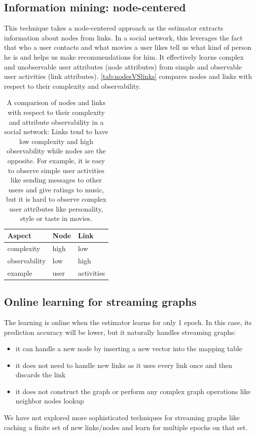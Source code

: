 \documentclass{article}
\begin{document}
\subsection{Information mining: node-centered}
This technique takes a node-centered approach as the estimator extracts 
information about nodes from links.
In a social network, this leverages the fact that who a user contacts and what 
movies a user likes tell us what kind of person he is and helps us make 
recommendations for him.
It effectively learns complex and unobservable user attributes (node 
attributes) from simple and observable user activities (link attributes). 
\autoref{tab:nodesVSlinks} compares nodes and links with respect to their 
complexity and observability.
\begin{table}[h]
	\centering
	\caption{A comparison of nodes and links with respect to their complexity 
		and attribute observability in a social network:
		Links tend to have low complexity and high observability while nodes 
		are the opposite.
		For example, it is easy to observe simple user activities like sending 
		messages to other users and give ratings to music,
		but it is hard to observe complex user attributes like personality, 
		style or taste in movies.}
	\begin{tabularx}{0.5\textwidth}{ |X|X|X| } \hline
		\textbf{Aspect} & \textbf{Node} & \textbf{Link} \\ \hline
		complexity & high & low \\ \hline
		observability & low & high \\ \hline
		example & user & activities \\ \hline
	\end{tabularx}
	\label{tab:nodesVSlinks}
\end{table}

\subsection{Online learning for streaming graphs}
The learning is online when the estimator learns for only 1 epoch. In 
this case, its prediction accuracy will be lower, but it naturally handles 
streaming graphs:
\begin{itemize}
	\item it can handle a new node by inserting a new vector into the mapping 
	table
	\item it does not need to handle new links as it uses every link once and 
	then discards the link
	\item it does not construct the graph or perform any complex graph 
	operations like neighbor nodes lookup
\end{itemize}
We have not explored more sophisticated techniques for streaming graphs like 
caching a finite set of new links/nodes and learn for multiple epochs on that 
set.
\end{document}
